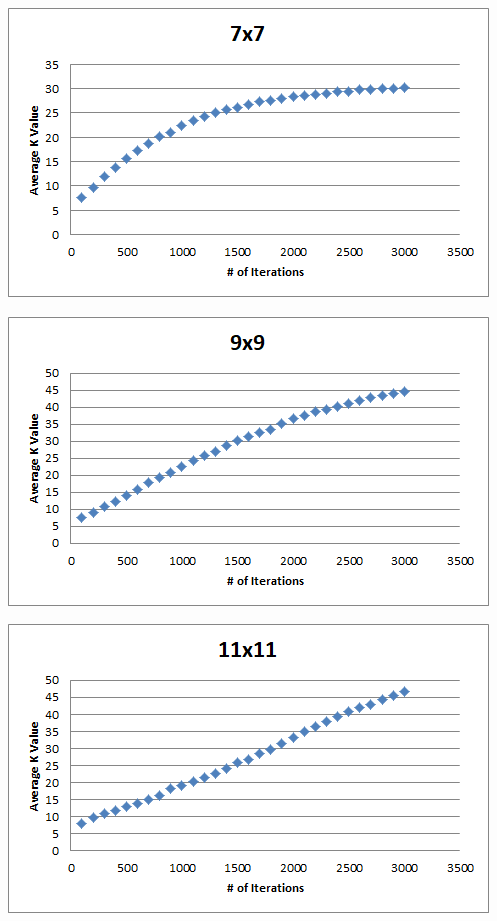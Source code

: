 \documentclass[12pt, letterpaper]{article}
\begin{document}
\bigskip

\includegraphics[width=\linewidth]{"Task 3/7x7 Scatterplot"}

\bigskip

\includegraphics[width=\linewidth]{"Task 3/9x9 Scatterplot"}

\bigskip

\includegraphics[width=\linewidth]{"Task 3/11x11 Scatterplot"}
\end{document}
